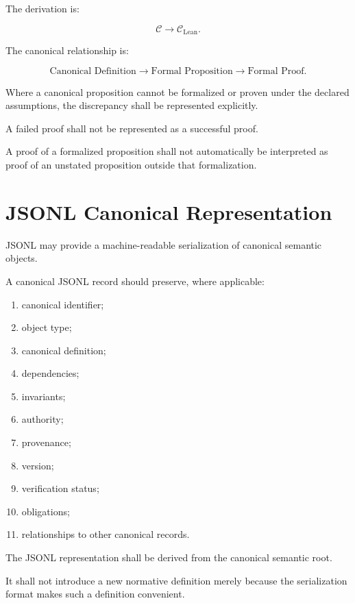 \documentclass[11pt]{article}
\newcommand{\Spec}{\mathcal{C}}
\begin{document}
The derivation is:

\[
\boxed{
\Spec
\rightarrow
\Spec_{\mathrm{Lean}}.
}
\]

The canonical relationship is:

\[
\text{Canonical Definition}
\rightarrow
\text{Formal Proposition}
\rightarrow
\text{Formal Proof}.
\]

Where a canonical proposition cannot be formalized or proven under
the declared assumptions, the discrepancy shall be represented
explicitly.

A failed proof shall not be represented as a successful proof.

A proof of a formalized proposition shall not automatically be
interpreted as proof of an unstated proposition outside that
formalization.

\section{JSONL Canonical Representation}

JSONL may provide a machine-readable serialization of canonical
semantic objects.

A canonical JSONL record should preserve, where applicable:

\begin{enumerate}
    \item canonical identifier;
    \item object type;
    \item canonical definition;
    \item dependencies;
    \item invariants;
    \item authority;
    \item provenance;
    \item version;
    \item verification status;
    \item obligations;
    \item relationships to other canonical records.
\end{enumerate}

The JSONL representation shall be derived from the canonical
semantic root.

It shall not introduce a new normative definition merely because
the serialization format makes such a definition convenient.
\end{document}
